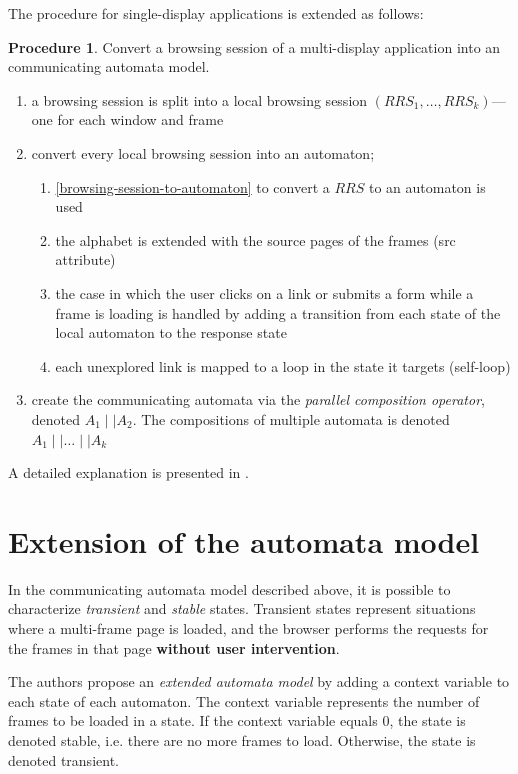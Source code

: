 \documentclass[a4paper,10pt]{article}
\theoremstyle{plain} %
\theoremstyle{definition}
\newtheorem{procedure}{Procedure}
\theoremstyle{remark}
\begin{document}
The procedure for single-display applications is extended as follows:

\begin{procedure}
  Convert a browsing session of a multi-display application into an communicating automata model.

  \begin{enumerate}
    \item a browsing session is split into a local browsing session $(RRS_1,\dots,RRS_k)$---one for each window and frame
    \item convert every local browsing session into an automaton;
      \begin{enumerate}
        \item \cref{browsing-session-to-automaton} to convert a $RRS$ to an automaton is used
        \item the alphabet is extended with the source pages of the frames (src attribute)
        \item the case in which the user clicks on a link or submits a form while a frame is loading is handled by adding a transition from each state of the local automaton to the response state
        \item each unexplored link is mapped to a loop in the state it targets (self-loop)
      \end{enumerate}
    \item create the communicating automata via the \textit{parallel composition operator}, denoted $A_1\mid\mid A_2$. The compositions of multiple automata is denoted $A_1\mid\mid\dots\mid\mid A_k$
  \end{enumerate}
\end{procedure}

A detailed explanation is presented in \cite{Haydar2004}.

\section{Extension of the automata model}

In the communicating automata model described above, it is possible to characterize \textit{transient} and \textit{stable} states. Transient states represent situations where a multi-frame page is loaded, and the browser performs the requests for the frames in that page \textbf{without user intervention}.

The authors propose an \textit{extended automata model} by adding a context variable to each state of each automaton. The context variable represents the number of frames to be loaded in a state. If the context variable equals 0, the state is denoted stable, i.e. there are no more frames to load. Otherwise, the state is denoted transient.
\end{document}
